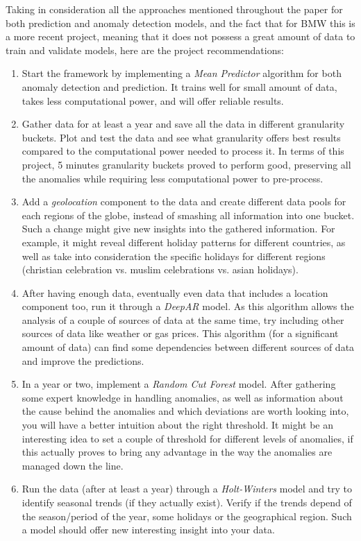 Taking in consideration all the approaches mentioned throughout the paper for both prediction and anomaly detection models, and the fact that for BMW this is a more recent project, meaning that it does not possess a great amount of data to train and validate models, here are the project recommendations:
\begin{enumerate}
    \item Start the framework by implementing a \textit{Mean Predictor} algorithm for both anomaly detection and prediction. It trains well for small amount of data, takes less computational power, and will offer reliable results.
    \item Gather data for at least a year and save all the data in different granularity buckets. Plot and test the data and see what granularity offers best results compared to the computational power needed to process it. In terms of this project, 5 minutes granularity buckets proved to perform good, preserving all the anomalies while requiring less computational power to pre-process.
    \item Add a \textit{geolocation} component to the data and create different data pools for each regions of the globe, instead of smashing all information into one bucket. Such a change might give new insights into the gathered information. For example, it might reveal different holiday patterns for different countries, as well as take into consideration the specific holidays for different regions (christian celebration vs. muslim celebrations vs. asian holidays). 
    \item After having enough data, eventually even data that includes a location component too, run it through a \textit{DeepAR} model. As this algorithm allows the analysis of a couple of sources of data at the same time, try including other sources of data like weather or gas prices. This algorithm (for a significant amount of data) can find some dependencies between different sources of data and improve the predictions.
    \item In a year or two, implement a \textit{Random Cut Forest} model. After gathering some expert knowledge in handling anomalies, as well as information about the cause behind the anomalies and which deviations are worth looking into, you will have a better intuition about the right threshold. It might be an interesting idea to set a couple of threshold for different levels of anomalies, if this actually proves to bring any advantage in the way the anomalies are managed down the line.
    \item Run the data (after at least a year) through a \textit{Holt-Winters} model and try to identify seasonal trends (if they actually exist). Verify if the trends depend of the season/period of the year, some holidays or the geographical region. Such a model should offer new interesting insight into your data.
\end{enumerate}